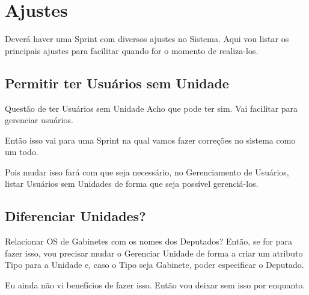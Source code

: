 \chapter{Ajustes}

Deverá haver uma Sprint com diversos ajustes no Sistema. Aqui vou listar os principais ajustes para facilitar quando for o momento de realiza-los.


\section{Permitir ter Usuários sem Unidade}

\begin{ajuste}{Questão de ter Usuários sem Unidade}
	Acho que pode ter sim. Vai facilitar para gerenciar usuários. 

	Então isso vai para uma Sprint na qual vamos fazer correções no sistema como um todo.

	Pois mudar isso fará com que seja necessário, no Gerenciamento de Usuários, listar Usuários sem Unidades de forma que seja possível gerenciá-los. 
\end{ajuste}


\section{Diferenciar Unidades?}

\begin{ajuste}{Relacionar OS de Gabinetes com os nomes dos Deputados?}
	Então, se for para fazer isso, vou precisar mudar o Gerenciar Unidade de forma a criar um atributo Tipo para a Unidade e, caso o Tipo seja Gabinete, poder especificar o Deputado.

	Eu ainda não vi benefícios de fazer isso. Então vou deixar sem isso por enquanto.
\end{ajuste}


